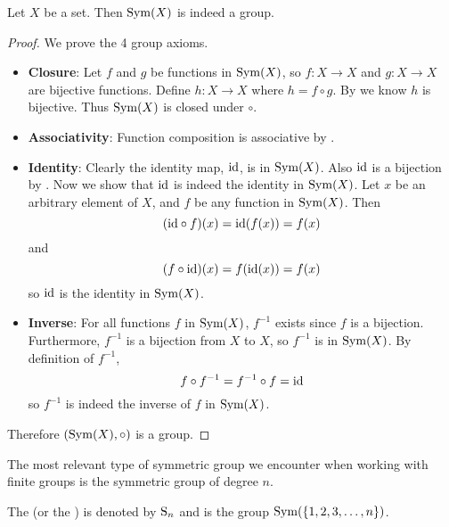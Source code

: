 \begin{proposition}
    Let $X$ be a set. Then $\mathrm{Sym}(X)$ is indeed a group.
\end{proposition}
\begin{proof}
    We prove the 4 group axioms.
    \begin{itemize}
        \item \textbf{Closure}: Let $f$ and $g$ be functions in $\mathrm{Sym}(X)$, so $f: X\to X$ and $g:X \to X$ are bijective functions. Define $h:X \to X$ where $h = f\circ g$. By  we know $h$ is bijective. Thus $\mathrm{Sym}(X)$ is closed under $\circ$.

        \item \textbf{Associativity}: Function composition is associative by .

        \item \textbf{Identity}: Clearly the identity map, $\mathrm{id}$, is in $\mathrm{Sym}(X)$. Also $\mathrm{id}$ is a bijection by . Now we show that $\mathrm{id}$ is indeed the identity in $\mathrm{Sym}(X)$. Let $x$ be an arbitrary element of $X$, and $f$ be any function in $\mathrm{Sym}(X)$. Then
        \[
            (\mathrm{id} \circ f)(x) = \mathrm{id}(f(x)) = f(x)
        \]
        and
        \[
            (f \circ \mathrm{id})(x) = f(\mathrm{id}(x)) = f(x)
        \]
        so $\mathrm{id}$ is the identity in $\mathrm{Sym}(X)$.

        \item \textbf{Inverse}: For all functions $f$ in $\mathrm{Sym}(X)$, $f^{-1}$ exists since $f$ is a bijection. Furthermore, $f^{-1}$ is a bijection from $X$ to $X$, so $f^{-1}$ is in $\mathrm{Sym}(X)$. By definition of $f^{-1}$,
        \[
            f \circ f^{-1} = f^{-1} \circ f = \mathrm{id}
        \]
        so $f^{-1}$ is indeed the inverse of $f$ in $\mathrm{Sym}(X)$.
    \end{itemize}
    Therefore $(\mathrm{Sym}(X), \circ)$ is a group.
\end{proof}

The most relevant type of symmetric group we encounter when working with finite groups is the symmetric group of degree $n$.

\begin{definition}
    The  (or the ) is denoted by $\mathrm{S}_{n}$ and is the group $\mathrm{Sym}(\{1, 2, 3, \dots, n\})$.
\end{definition}

